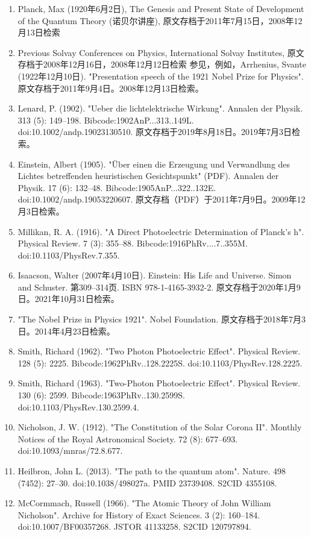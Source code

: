 \begin{enumerate}
\item Planck, Max (1920年6月2日), The Genesis and Present State of Development of the Quantum Theory (诺贝尔讲座), 原文存档于2011年7月15日，2008年12月13日检索  
\item Previous Solvay Conferences on Physics, International Solvay Institutes, 原文存档于2008年12月16日，2008年12月12日检索  
参见，例如，Arrhenius, Svante (1922年12月10日). "Presentation speech of the 1921 Nobel Prize for Physics". 原文存档于2011年9月4日。2008年12月13日检索。  
\item Lenard, P. (1902). "Ueber die lichtelektrische Wirkung". Annalen der Physik. 313 (5): 149–198. Bibcode:1902AnP...313..149L. doi:10.1002/andp.19023130510. 原文存档于2019年8月18日。2019年7月3日检索。  
\item Einstein, Albert (1905). "Über einen die Erzeugung und Verwandlung des Lichtes betreffenden heuristischen Gesichtspunkt" (PDF). Annalen der Physik. 17 (6): 132–48. Bibcode:1905AnP...322..132E. doi:10.1002/andp.19053220607. 原文存档（PDF）于2011年7月9日。2009年12月3日检索。
\item Millikan, R. A. (1916). "A Direct Photoelectric Determination of Planck's h". Physical Review. 7 (3): 355–88. Bibcode:1916PhRv....7..355M. doi:10.1103/PhysRev.7.355.  
\item Isaacson, Walter (2007年4月10日). Einstein: His Life and Universe. Simon and Schuster. 第309–314页. ISBN 978-1-4165-3932-2. 原文存档于2020年1月9日。2021年10月31日检索。  
\item "The Nobel Prize in Physics 1921". Nobel Foundation. 原文存档于2018年7月3日。2014年4月23日检索。  
\item Smith, Richard (1962). "Two Photon Photoelectric Effect". Physical Review. 128 (5): 2225. Bibcode:1962PhRv..128.2225S. doi:10.1103/PhysRev.128.2225.  
\item Smith, Richard (1963). "Two-Photon Photoelectric Effect". Physical Review. 130 (6): 2599. Bibcode:1963PhRv..130.2599S. doi:10.1103/PhysRev.130.2599.4.  
\item Nicholson, J. W. (1912). "The Constitution of the Solar Corona II". Monthly Notices of the Royal Astronomical Society. 72 (8): 677–693. doi:10.1093/mnras/72.8.677.  
\item Heilbron, John L. (2013). "The path to the quantum atom". Nature. 498 (7452): 27–30. doi:10.1038/498027a. PMID 23739408. S2CID 4355108.  
\item McCormmach, Russell (1966). "The Atomic Theory of John William Nicholson". Archive for History of Exact Sciences. 3 (2): 160–184. doi:10.1007/BF00357268. JSTOR 41133258. S2CID 120797894.  

\end{enumerate}
